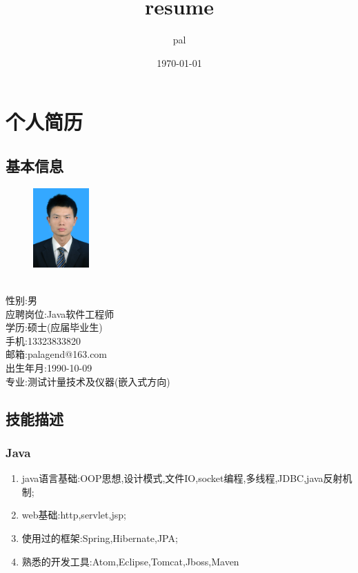 \documentclass[11pt]{ctexart}
\author{pal}
\date{\today}
\title{resume}
\begin{document}
\maketitle
\tableofcontents

\section{个人简历}
\label{sec-1}
\subsection{基本信息}
\label{sec-1-1}

\begin{figure}
\includegraphics[height=1.2in]{portrait}\
\end{figure}
\\
性别:男\\
应聘岗位:Java软件工程师\\
学历:硕士(应届毕业生)\\
手机:13323833820\\
邮箱:palagend@163.com\\
出生年月:1990-10-09\\
专业:测试计量技术及仪器(嵌入式方向)\\



\subsection{技能描述}
\label{sec-1-2}
\subsubsection{Java}
\label{sec-1-2-1}
\begin{enumerate}
\item java语言基础:OOP思想,设计模式,文件IO,socket编程,多线程,JDBC,java反射机制;
\item web基础:http,servlet,jsp;
\item 使用过的框架:Spring,Hibernate,JPA;
\item 熟悉的开发工具:Atom,Eclipse,Tomcat,Jboss,Maven
\end{enumerate}
\end{document}
